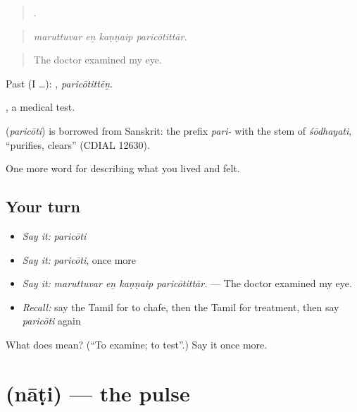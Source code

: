 \begin{quote}
   .
\end{quote}

\begin{quote}
\emph{maruttuvar eṉ kaṇṇaip paricōtittār.}
\end{quote}

\begin{quote}
The doctor examined my eye.
\end{quote}

Past (I …): , \emph{paricōtittēṉ}.

, a medical test.

\begin{cousinweb}
\textbf{} (\emph{paricōti}) is borrowed from Sanskrit: the prefix \emph{pari-} with the stem of \emph{śōdhayati}, \textquotedblleft{}purifies, clears\textquotedblright{} (CDIAL 12630).
\end{cousinweb}

\begin{grammarlens}[title={What you've built}]
One more word for describing what you lived and felt.
\end{grammarlens}

\subsection*{Your turn}
\begin{itemize}
\raggedright
  \item \emph{Say it:} \emph{paricōti}
  \item \emph{Say it:} \emph{paricōti}, once more
  \item \emph{Say it:} \emph{maruttuvar eṉ kaṇṇaip paricōtittār.} — The doctor examined my eye.
  \item \emph{Recall:} say the Tamil for to chafe, then the Tamil for treatment, then say \emph{paricōti} again
\end{itemize}

\begin{tcolorbox}[breakable,colback=teal!4,colframe=teal!35!black,title={Before you move on}]
What does  mean? (\textquotedblleft{}To examine; to test\textquotedblright{}.) Say it once more.
\end{tcolorbox}
\section[\texorpdfstring{\ta{நாடி} (nāṭi)}{நாடி (nāṭi)}]{ (nāṭi) — the pulse}

